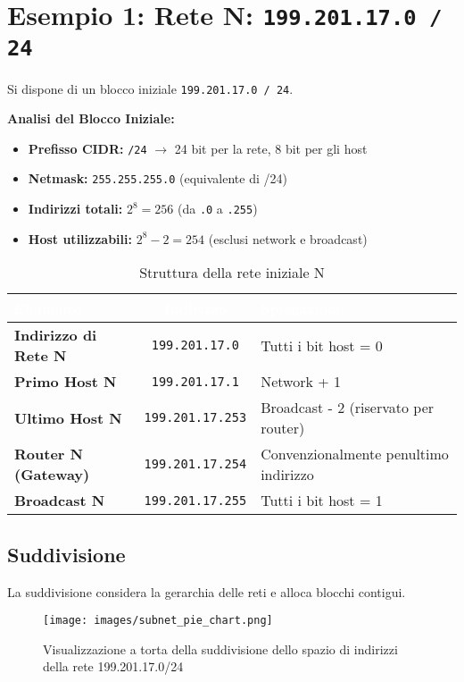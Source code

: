 \newpage
\section{Esempio 1: Rete N: \texttt{199.201.17.0 / 24}}
Si dispone di un blocco iniziale \texttt{199.201.17.0 / 24}.

\textbf{Analisi del Blocco Iniziale:}
\begin{itemize}
    \item \textbf{Prefisso CIDR:} \texttt{/24} $\rightarrow$ 24 bit per la rete, 8 bit per gli host
    \item \textbf{Netmask:} \texttt{255.255.255.0} (equivalente di /24)
    \item \textbf{Indirizzi totali:} $2^8 = 256$ (da \texttt{.0} a \texttt{.255})
    \item \textbf{Host utilizzabili:} $2^8 - 2 = 254$ (esclusi network e broadcast)
\end{itemize}

\begin{table}[h]
\centering
\begin{tabular}{|l|c|l|}
\hline
\rowcolor{bg_custom}
\textcolor{white}{\textbf{Elemento}} & \textcolor{white}{\textbf{Indirizzo}} & \textcolor{white}{\textbf{Spiegazione}} \\
\hline
\textbf{Indirizzo di Rete N} & \texttt{199.201.17.0} & Tutti i bit host = 0 \\
\hline
\textbf{Primo Host N} & \texttt{199.201.17.1} & Network + 1 \\
\hline
\textbf{Ultimo Host N} & \texttt{199.201.17.253} & Broadcast - 2 (riservato per router) \\
\hline
\textbf{Router N (Gateway)} & \texttt{199.201.17.254} & Convenzionalmente penultimo indirizzo \\
\hline
\textbf{Broadcast N} & \texttt{199.201.17.255} & Tutti i bit host = 1 \\
\hline
\end{tabular}
\caption{Struttura della rete iniziale N}
\end{table}

\subsection{Suddivisione}
La suddivisione considera la gerarchia delle reti e alloca blocchi contigui.

\begin{figure}[H]
    \centering
    \texttt{[image: images/subnet\_pie\_chart.png]}
    \caption{Visualizzazione a torta della suddivisione dello spazio di indirizzi della rete 199.201.17.0/24}
    \label{fig:subnet_pie}
\end{figure}
    
